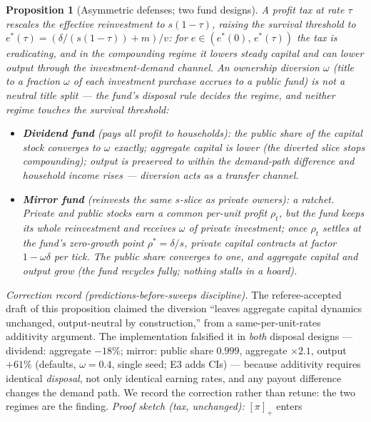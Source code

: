\documentclass[11pt]{article}
\newtheorem{proposition}{Proposition}
\newcommand{\relu}[1]{\left[#1\right]_+}
\begin{document}
\begin{proposition}[Asymmetric defenses; two fund designs]\label{prop:defenses}
A profit tax at rate $\tau$ rescales the effective reinvestment to
$s(1-\tau)$, raising the survival threshold to
$e^{*}(\tau) = (\delta/(s(1-\tau)) + m)/v$: for
$e \in (e^{*}(0),\, e^{*}(\tau))$ the tax is \emph{eradicating}, and in the
compounding regime it lowers steady capital and can lower output through the
investment-demand channel. An ownership diversion $\omega$ (title to a
fraction $\omega$ of each investment purchase accrues to a public fund) is
\emph{not} a neutral title split --- the fund's disposal rule decides the
regime, and neither regime touches the survival threshold:
\begin{itemize}
  \item \textbf{Dividend fund} (pays all profit to households): the public
  share of the capital stock converges to $\omega$ exactly; aggregate
  capital is lower (the diverted slice stops compounding); output is
  preserved to within the demand-path difference and household income rises
  --- diversion acts as a \emph{transfer} channel.
  \item \textbf{Mirror fund} (reinvests the same $s$-slice as private
  owners): a \emph{ratchet}. Private and public stocks earn a common
  per-unit profit $\rho_t$, but the fund keeps its whole reinvestment
  \emph{and} receives $\omega$ of private investment; once $\rho_t$ settles
  at the fund's zero-growth point $\rho^{*} = \delta/s$, private capital
  contracts at factor $1-\omega\delta$ per tick. The public share converges
  to one, and aggregate capital and output \emph{grow} (the fund recycles
  fully; nothing stalls in a hoard).
\end{itemize}
\end{proposition}
\noindent\emph{Correction record (predictions-before-sweeps discipline).}
The referee-accepted draft of this proposition claimed the diversion
``leaves aggregate capital dynamics unchanged, output-neutral by
construction,'' from a same-per-unit-rates additivity argument. The
implementation falsified it in \emph{both} disposal designs --- dividend:
aggregate $-18\%$; mirror: public share $0.999$, aggregate $\times 2.1$,
output $+61\%$ (defaults, $\omega = 0.4$, single seed; E3 adds CIs) ---
because additivity requires identical \emph{disposal}, not only identical
earning rates, and any payout difference changes the demand path. We record
the correction rather than retune: the two regimes are the finding.
\emph{Proof sketch (tax, unchanged):} $\relu{\pi}$ enters
\end{document}
